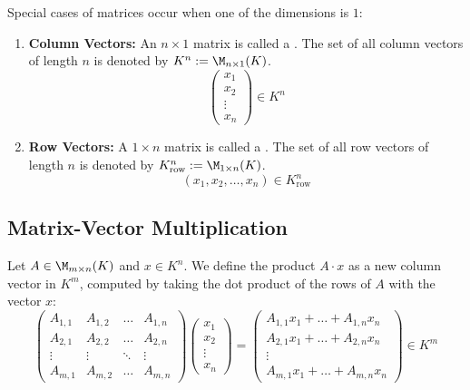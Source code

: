 \begin{definition}
Special cases of matrices occur when one of the dimensions is $1$:
\begin{enumerate}
    \item \textbf{Column Vectors:} An $n \times 1$ matrix is called a . The set of all column vectors of length $n$ is denoted by $K^n := \M_{n \times 1}(K)$.
    \[
    \begin{pmatrix} x_1 \\ x_2 \\ \vdots \\ x_n \end{pmatrix} \in K^n
    \]
    \item \textbf{Row Vectors:} A $1 \times n$ matrix is called a . The set of all row vectors of length $n$ is denoted by $K_{\text{row}}^n := \M_{1 \times n}(K)$.
    \[
    (x_1, x_2, \dots, x_n) \in K_{\text{row}}^n
    \]
\end{enumerate}
\end{definition}

\subsection{Matrix-Vector Multiplication}

\begin{definition}
Let $A \in \M_{m \times n}(K)$ and $x \in K^n$. We define the product $A \cdot x$ as a new column vector in $K^m$, computed by taking the dot product of the rows of $A$ with the vector $x$:
\[
\begin{pmatrix} 
A_{1,1} & A_{1,2} & \dots & A_{1,n} \\
A_{2,1} & A_{2,2} & \dots & A_{2,n} \\
\vdots & \vdots & \ddots & \vdots \\
A_{m,1} & A_{m,2} & \dots & A_{m,n} 
\end{pmatrix}
\begin{pmatrix} x_1 \\ x_2 \\ \vdots \\ x_n \end{pmatrix}
=
\begin{pmatrix} 
A_{1,1}x_1 + \dots + A_{1,n}x_n \\
A_{2,1}x_1 + \dots + A_{2,n}x_n \\
\vdots \\
A_{m,1}x_1 + \dots + A_{m,n}x_n 
\end{pmatrix} \in K^m
\]
\end{definition}

